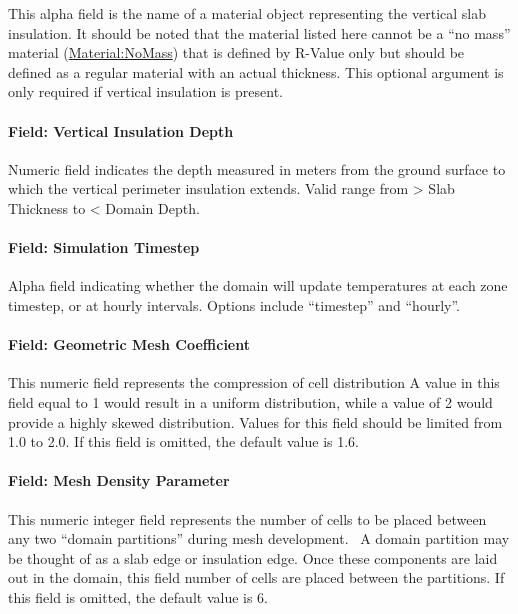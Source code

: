 This alpha field is the name of a material object representing the vertical slab insulation. It should be noted that the material listed here cannot be a ``no mass'' material  (\hyperref[materialnomass]{Material:NoMass}) that is defined by R-Value only but should be defined as a regular material with an actual thickness. This optional argument is only required if vertical insulation is present.

\paragraph{Field: Vertical Insulation Depth}\label{field-vertical-insulation-depth}

Numeric field indicates the depth measured in meters from the ground surface to which the vertical perimeter insulation extends. Valid range from \textgreater{} Slab Thickness to \textless{} Domain Depth.

\paragraph{Field: Simulation Timestep}\label{field-simulation-timestep}

Alpha field indicating whether the domain will update temperatures at each zone timestep, or at hourly intervals. Options include ``timestep'' and ``hourly''.

\paragraph{Field: Geometric Mesh Coefficient}

This numeric field represents the compression of cell distribution A value in this field equal to 1 would result in a uniform distribution, while a value of 2 would provide a highly skewed distribution. Values for this field should be limited from 1.0 to 2.0. If this field is omitted, the default value is 1.6.

\paragraph{Field: Mesh Density Parameter}

This numeric integer field represents the number of cells to be placed between any two ``domain partitions'' during mesh development.~ A domain partition may be thought of as a slab edge or insulation edge. Once these components are laid out in the domain, this field number of cells are placed between the partitions. If this field is omitted, the default value is 6.

